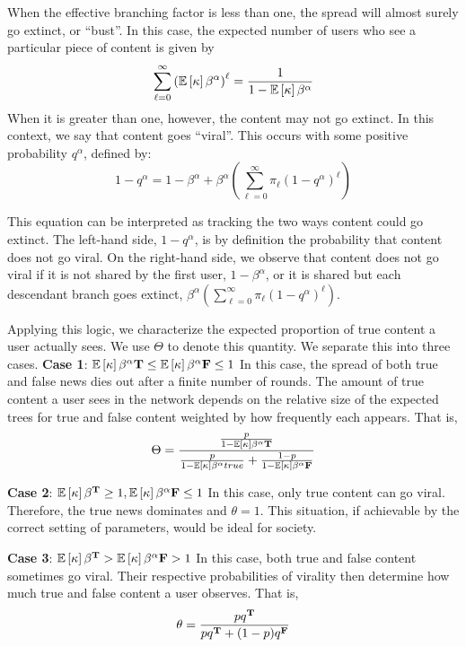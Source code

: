 When the effective branching factor is less than one, the spread will almost surely go extinct, or ``bust''. In this case, the expected number of users who see a particular piece of content is given by 
\begin{equation}
    \sum_{\ell=0}^\infty  {\left(\mathbb{E}\left[ \kappa \right]  \beta^{\alpha} \right)}^\ell = \frac{1}{1-\mathbb{E}\left[ \kappa \right] \beta^{\alpha} }
\end{equation}
When it is greater than one, however, the content may not go extinct. In this context, we say that content goes ``viral''. This occurs with some positive probability $q^\alpha$, defined by: 
\begin{equation*}
    1-q^\alpha = 1 -\beta^\alpha + \beta^\alpha \left( \sum_{\ell=0}^\infty \pi_\ell {\left(1-q^\alpha\right)}^\ell \right)
\end{equation*}

This equation can be interpreted as tracking the two ways content could go extinct. The left-hand side, $1-q^\alpha$, is by definition the probability that content does not go viral. On the right-hand side, we observe that content does not go viral if it is not shared by the first user, $1-\beta^\alpha$, or it is shared but each descendant branch goes extinct, $\beta^\alpha \left( \sum_{\ell=0}^\infty \pi_\ell {\left(1-q^\alpha\right)}^\ell \right)$.

Applying this logic, we characterize the expected proportion of true content a user actually sees. We use $\Theta$ to denote this quantity. We separate this into three cases. 
\textbf{Case 1}: $\mathbb{E}\left[ \kappa \right] \beta^{\alpha}{\mathbf{T}} \leq \mathbb{E}\left[ \kappa \right] \beta^{\alpha}{\mathbf{F}} \leq 1 $ 
In this case, the spread of both true and false news dies out after a finite number of rounds. The amount of true content a user sees in the network depends on the relative size of the expected trees for true and false content weighted by how frequently each appears. That is, 
\[ \Theta = \frac{ \frac{p}{ 1 - \mathbb{E}\left[ \kappa \right] \beta^{\alpha}{\mathbf{T}}}}{ \frac{p}{1-\mathbb{E}\left[ \kappa \right] \beta^{\alpha}{true}} + \frac{1-p}{1-\mathbb{E}\left[ \kappa \right] \beta^{\alpha}{\mathbf{F}}}} \]


\textbf{Case 2}:  $\mathbb{E}\left[ \kappa \right] \beta^{\mathbf{T}} \geq  1,  \mathbb{E}\left[ \kappa \right] \beta^{\alpha}{\mathbf{F}} \leq 1 $ 
In this case, only true content can go viral. Therefore, the true news dominates and $\theta=1$. This situation, if achievable by the correct setting of parameters, would be ideal for society. 

\textbf{Case 3}:  $\mathbb{E}\left[ \kappa \right] \beta^{\mathbf{T}} >\mathbb{E}\left[ \kappa \right] \beta^{\alpha}{\mathbf{F}} >  1 $ 
In this case, both true and false content sometimes go viral. Their respective probabilities of virality then determine how much true and false content a user observes. That is, 
\begin{equation}
    \theta = \frac{pq^{\mathbf{T}}}{pq^{\mathbf{T}} + (1-p)q^{\mathbf{F}} } 
\end{equation}



